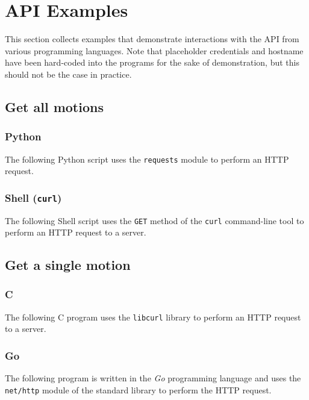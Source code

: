 
\hypertarget{api-examples}{%
\section{API Examples}\label{sec:api-examples}}

This section collects examples that demonstrate interactions with the API
from various programming languages. Note that placeholder credentials and hostname have been hard-coded into the programs for the sake of demonstration, but this should not be the case in practice.


\subsection{Get all motions}\label{get-all-motions}

\subsubsection{Python}
The following Python script uses the \texttt{requests} module to perform an HTTP request.
% 


\subsubsection{Shell (\texttt{curl})}\label{sec:get-all-shell}

The following Shell script uses the \texttt{GET} method of the \texttt{curl} command-line tool to perform an HTTP request to a server.
% 


\subsection{Get a single motion}\label{get-a-single-motion}

\subsubsection{C}
The following C program uses the \texttt{libcurl} library to perform an HTTP request to a server. 



\subsubsection{Go}
The following program is written in the \emph{Go} programming language and uses the \texttt{net/http} module of the standard library to perform the HTTP request.



